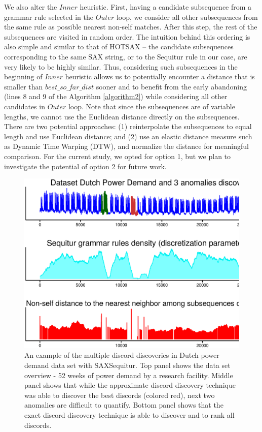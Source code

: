 \documentclass{llncs}
\begin{document}
We also alter the $Inner$ heuristic. First, having a candidate subsequence from a grammar rule selected in the $Outer$ loop, we consider all other subsequences from the same rule as possible nearest non-self matches. After this step, the rest of the subsequences are visited in random order. The intuition behind this ordering is also simple and similar to that of HOTSAX -- the 
candidate subsequences corresponding to the same SAX string, or to the Sequitur rule in our case, are very likely to be highly similar. Thus, considering such subsequences in the beginning of $Inner$ heuristic allows us to potentially encounter a distance that is smaller than $best\_so\_far\_dist$ sooner and to benefit from the early abandoning (lines 8 and 9 of the Algorithm \ref{algorithm2}) while considering all other candidates in $Outer$ loop. Note that since the subsequences are of variable lengths, we cannot use the Euclidean distance directly on the subsequences. There are two potential approaches: (1) reinterpolate the subsequences to equal length and use Euclidean distance; and (2) use an elastic distance measure such as Dynamic Time Warping (DTW), and normalize the distance for meaningful comparison. For the current study, we opted for option 1, but we plan to investigate the potential of option 2 for future work. %

\begin{figure}[!t]
   \vspace{-0.3cm}
   \centering
   \includegraphics[width=120mm]{DutchPD_new.ps}
   \caption{An example of the multiple discord discoveries in Dutch power demand data set with SAXSequitur. Top panel shows the data set overview - 52 weeks of power demand by a research facility. Middle panel shows that while the approximate discord discovery technique was able to discover the best discords (colored red), next two anomalies are difficult to quantify. Bottom panel shows that the exact discord discovery technique is able to discover and to rank all discords.}
   \label{fig:dutch_PD}
   \vspace{-0.3cm}
\end{figure}
\end{document}
